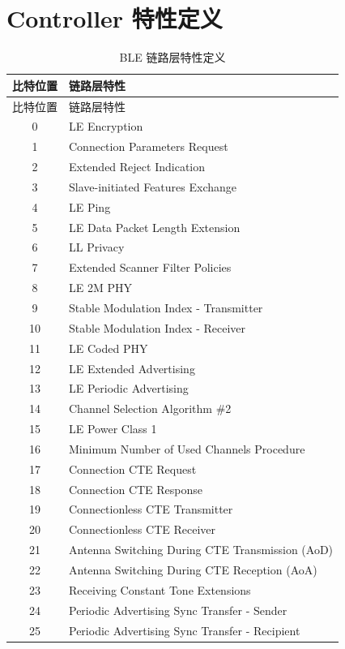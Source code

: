 \documentclass[
  12pt,
]{book}
\begin{document}
\hypertarget{controller-ux7279ux6027ux5b9aux4e49}{%
\section{Controller 特性定义}\label{controller-ux7279ux6027ux5b9aux4e49}}

\begin{longtable}[]{@{}cl@{}}
\caption{\label{tab:ch-overview-ble-features} BLE 链路层特性定义}\tabularnewline
\toprule()
比特位置 & 链路层特性 \\
\midrule()
\endfirsthead
\toprule()
比特位置 & 链路层特性 \\
\midrule()
\endhead
0 & LE Encryption \\
1 & Connection Parameters Request \\
2 & Extended Reject Indication \\
3 & Slave-initiated Features Exchange \\
4 & LE Ping \\
5 & LE Data Packet Length Extension \\
6 & LL Privacy \\
7 & Extended Scanner Filter Policies \\
8 & LE 2M PHY \\
9 & Stable Modulation Index - Transmitter \\
10 & Stable Modulation Index - Receiver \\
11 & LE Coded PHY \\
12 & LE Extended Advertising \\
13 & LE Periodic Advertising \\
14 & Channel Selection Algorithm \#2 \\
15 & LE Power Class 1 \\
16 & Minimum Number of Used Channels Procedure \\
17 & Connection CTE Request \\
18 & Connection CTE Response \\
19 & Connectionless CTE Transmitter \\
20 & Connectionless CTE Receiver \\
21 & Antenna Switching During CTE Transmission (AoD) \\
22 & Antenna Switching During CTE Reception (AoA) \\
23 & Receiving Constant Tone Extensions \\
24 & Periodic Advertising Sync Transfer - Sender \\
25 & Periodic Advertising Sync Transfer - Recipient \\

\end{longtable}
\end{document}

